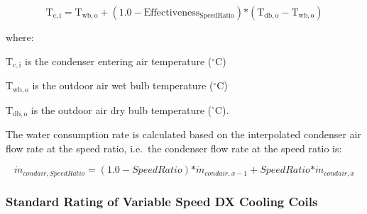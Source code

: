 \begin{equation}
{{\mathrm{T}}_{{\mathrm{c}},{\mathrm{i}}}} = {{\mathrm{T}}_{{\mathrm{wb}},{\mathrm{o}}}} + (1.0 - {\mathrm{Effectivenes}}{{\mathrm{s}}_{{\mathrm{SpeedRatio}}}}){\mathrm{*}}({{\mathrm{T}}_{{\mathrm{db}},{\mathrm{o}}}} - {{\mathrm{T}}_{{\mathrm{wb}},{\mathrm{o}}}})
\end{equation}

where:

\({{\mathrm{T}}_{{\mathrm{c}},{\mathrm{i}}}}\) is the condenser entering air temperature (\(^{\circ}\)C)

\({{\mathrm{T}}_{{\mathrm{wb}},{\mathrm{o}}}}\) is the outdoor air wet bulb temperature (\(^{\circ}\)C)

\({{\mathrm{T}}_{{\mathrm{db}},{\mathrm{o}}}}\) is the outdoor air dry bulb temperature (\(^{\circ}\)C).

The water consumption rate is calculated based on the interpolated condenser air flow rate at the speed ratio, i.e.~the condenser flow rate at the speed ratio is:

\begin{equation}
{\dot m_{condair,SpeedRatio}} = \left( {1.0 - SpeedRatio} \right){\mathrm{*}}{\dot m_{condair,x - 1}} + SpeedRatio{\mathrm{*}}{\dot m_{condair,x}}
\end{equation}

\subsubsection{Standard Rating of Variable Speed DX Cooling Coils}\label{standard-rating-of-variable-speed-dx-cooling-coils}

